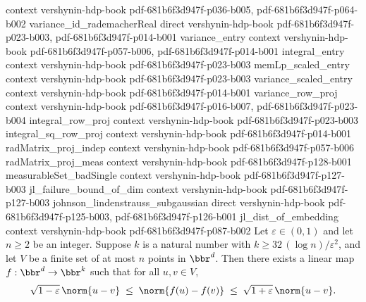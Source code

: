 \begin{theorem}
  {context}
  {vershynin-hdp-book}
  {pdf-681b6f3d947f-p036-b005,
    pdf-681b6f3d947f-p064-b002}
\proofstep
  {variance_id_rademacherReal}
  {direct}
  {vershynin-hdp-book}
  {pdf-681b6f3d947f-p023-b003,
    pdf-681b6f3d947f-p014-b001}
\proofstep
  {variance_entry}
  {context}
  {vershynin-hdp-book}
  {pdf-681b6f3d947f-p057-b006,
    pdf-681b6f3d947f-p014-b001}
\proofstep
  {integral_entry}
  {context}
  {vershynin-hdp-book}
  {pdf-681b6f3d947f-p023-b003}
\proofstep
  {memLp_scaled_entry}
  {context}
  {vershynin-hdp-book}
  {pdf-681b6f3d947f-p023-b003}
\proofstep
  {variance_scaled_entry}
  {context}
  {vershynin-hdp-book}
  {pdf-681b6f3d947f-p014-b001}
\proofstep
  {variance_row_proj}
  {context}
  {vershynin-hdp-book}
  {pdf-681b6f3d947f-p016-b007,
    pdf-681b6f3d947f-p023-b004}
\proofstep
  {integral_row_proj}
  {context}
  {vershynin-hdp-book}
  {pdf-681b6f3d947f-p023-b003}
\proofstep
  {integral_sq_row_proj}
  {context}
  {vershynin-hdp-book}
  {pdf-681b6f3d947f-p014-b001}
\proofstep
  {radMatrix_proj_indep}
  {context}
  {vershynin-hdp-book}
  {pdf-681b6f3d947f-p057-b006}
\proofstep
  {radMatrix_proj_meas}
  {context}
  {vershynin-hdp-book}
  {pdf-681b6f3d947f-p128-b001}
\proofstep
  {measurableSet_badSingle}
  {context}
  {vershynin-hdp-book}
  {pdf-681b6f3d947f-p127-b003}
\proofstep
  {jl_failure_bound_of_dim}
  {context}
  {vershynin-hdp-book}
  {pdf-681b6f3d947f-p127-b003}
\proofstep
  {johnson_lindenstrauss_subgaussian}
  {direct}
  {vershynin-hdp-book}
  {pdf-681b6f3d947f-p125-b003,
    pdf-681b6f3d947f-p126-b001}
\proofstep
  {jl_dist_of_embedding}
  {context}
  {vershynin-hdp-book}
  {pdf-681b6f3d947f-p087-b002}
Let $\varepsilon \in (0,1)$ and let $n \ge 2$ be an integer. Suppose $k$ is a natural
number with $k \ge 32\,(\log n)/\varepsilon^2$, and let $V$ be a finite set of at most
$n$ points in $\bbr^d$. Then there exists a linear map $f : \bbr^d \to \bbr^k$ such that
for all $u, v \in V$,
\[
\sqrt{1-\varepsilon}\,\norm{u-v} \;\le\; \norm{f(u)-f(v)} \;\le\;
\sqrt{1+\varepsilon}\,\norm{u-v}.
\]
\end{theorem}

